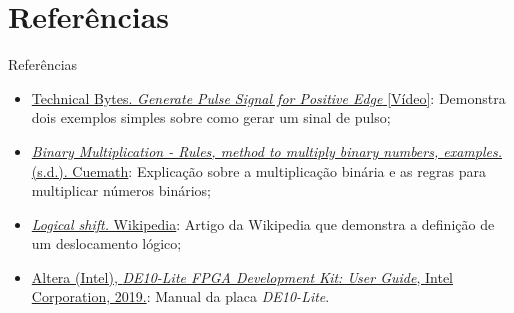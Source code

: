 \pagestyle{referencias}

\section*{Referências} \label{Referências}
{\protect\numberline{}Referências}

\begin{itemize}
    \item \href{https://www.youtube.com/watch?v=CBtj4x59mUg&t=169s}{Technical Bytes. \textit{Generate Pulse Signal for Positive Edge} [Vídeo]}: Demonstra dois exemplos simples sobre como gerar um sinal de pulso;\@
    \item \href{https://www.cuemath.com/numbers/binary-multiplication/}{\textit{Binary Multiplication - Rules, method to multiply binary numbers, examples.} (s.d.). Cuemath}: Explicação sobre a multiplicação binária e as regras para multiplicar números binários;\@
    \item \href{https://en.wikipedia.org/wiki/Logical_shift}{\textit{Logical shift.} Wikipedia}: Artigo da Wikipedia que demonstra a definição de um deslocamento lógico;\@
    \item \href{https://ftp.intel.com/Public/Pub/fpgaup/pub/Intel_Material/Boards/DE10-Lite/DE10_Lite_User_Manual.pdf}{Altera (Intel), \textit{DE10-Lite FPGA Development Kit: User Guide}, Intel Corporation, 2019.}: Manual da placa \textit{DE10-Lite}.\@
\end{itemize}

\newpage